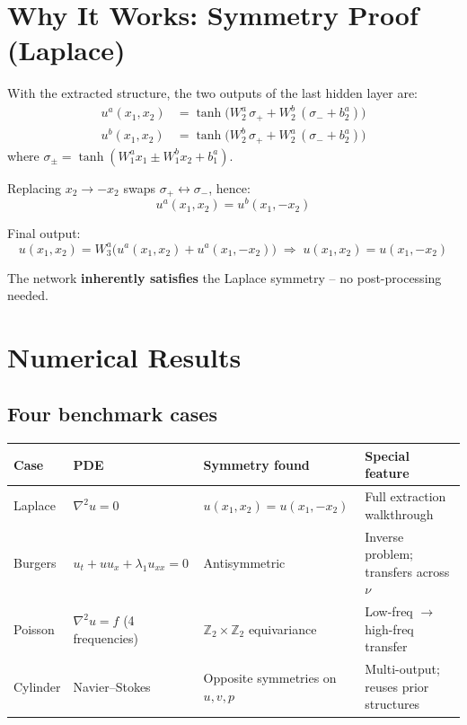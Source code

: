 \documentclass[11pt,a4paper]{article}
\begin{document}
\section{Why It Works: Symmetry Proof (Laplace)}

With the extracted structure, the two outputs of the last hidden layer are:
\begin{align}
u^a(x_1,x_2) &= \tanh\!\big(W_2^a\,\sigma_+ + W_2^b\,(\sigma_- + b_2^a)\big) \\
u^b(x_1,x_2) &= \tanh\!\big(W_2^b\,\sigma_+ + W_2^a\,(\sigma_- + b_2^a)\big)
\end{align}
where $\sigma_\pm = \tanh(W_1^a x_1 \pm W_1^b x_2 + b_1^a)$.

Replacing $x_2\to -x_2$ swaps $\sigma_+\leftrightarrow\sigma_-$, hence:
\begin{equation}
\boxed{u^a(x_1,x_2) = u^b(x_1,-x_2)}
\end{equation}

Final output:
\begin{equation}
u(x_1,x_2) = W_3^a\big(u^a(x_1,x_2)+u^a(x_1,-x_2)\big) \;\Longrightarrow\; u(x_1,x_2)=u(x_1,-x_2)
\end{equation}

The network \textbf{inherently satisfies} the Laplace symmetry -- no post-processing needed.

\section{Numerical Results}

\subsection{Four benchmark cases}

\begin{center}
\renewcommand{\arraystretch}{1.25}
\begin{tabular}{@{}l l l l@{}}
\toprule
\textbf{Case} & \textbf{PDE} & \textbf{Symmetry found} & \textbf{Special feature} \\
\midrule
Laplace    & $\nabla^2 u=0$ & $u(x_1,x_2)=u(x_1,-x_2)$ & Full extraction walkthrough \\
Burgers    & $u_t+uu_x+\lambda_1 u_{xx}=0$ & Antisymmetric & Inverse problem; transfers across $\nu$ \\
Poisson    & $\nabla^2 u=f$ (4 frequencies) & $\mathbb{Z}_2\!\times\!\mathbb{Z}_2$ equivariance & Low-freq $\to$ high-freq transfer \\
Cylinder   & Navier--Stokes & Opposite symmetries on $u,v,p$ & Multi-output; reuses prior structures \\
\bottomrule
\end{tabular}
\end{center}
\end{document}
